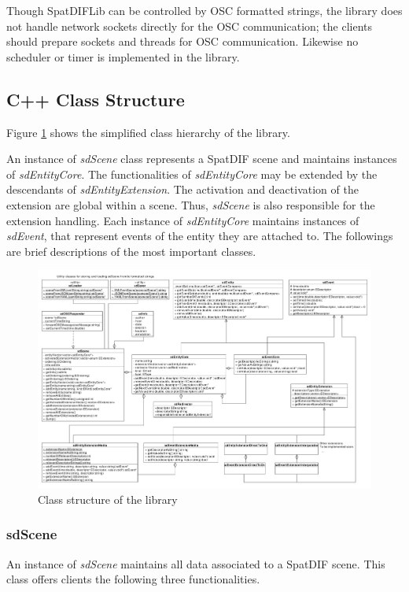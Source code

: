 \documentclass[a4paper]{article}
\begin{document}
Though SpatDIFLib can be controlled by OSC \cite{Wessel_2002, Schmeder_2008} formatted strings, the library does not handle network sockets directly for the OSC communication; the clients should prepare sockets and threads for OSC communication. Likewise no scheduler or timer is implemented in the library. 
  
\subsection{C++ Class Structure}

Figure \ref{fig:class_structure} shows the simplified class hierarchy of the library. 

An instance of {\it sdScene} class represents a SpatDIF scene and maintains instances of {\it sdEntityCore}. The functionalities of {\it sdEntityCore} may be extended by the descendants of {\it sdEntityExtension}. 
The activation and deactivation of the extension are global within a scene. 
Thus, {\it sdScene} is also responsible for the extension handling. 
Each instance of {\it sdEntityCore} maintains instances of {\it sdEvent}, that represent events of the entity they are attached to.
The followings are brief descriptions of the most important classes.

\begin{figure}[t]
\centerline{ 
	\includegraphics[width= 18cm]{classes.pdf}}
\caption{Class structure of the library}
\label{fig:class_structure}
\end{figure}

\subsubsection{sdScene}
An instance of {\it sdScene} maintains all data associated to a SpatDIF scene. This class offers clients the following three functionalities.
\end{document}

